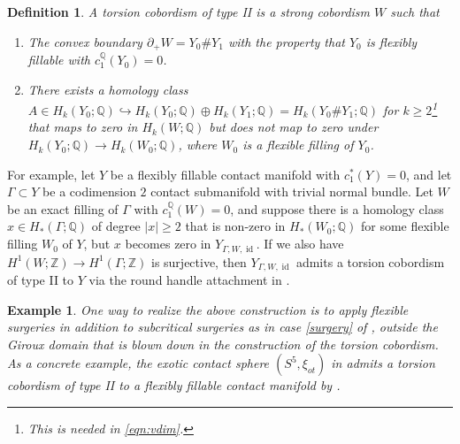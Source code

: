 \documentclass[11pt]{amsart}
\numberwithin{equation}{section}
\newtheorem{definition}[theorem]{\textbf{Definition}}
\newtheorem{example}[theorem]{\textbf{Example}}
\def\Z{{\mathbb Z}}
\def\Q{{\mathbb Q}}
\DeclareMathOperator{\Id}{id}
\begin{document}
\begin{definition}
        A torsion cobordism of type II is a strong cobordism $W$ such that
        \begin{enumerate}
            \item The convex boundary $\partial_+ W=Y_0\#Y_1$ with the property that $Y_0$ is flexibly fillable with $c_1^{\Q}(Y_0)=0$. 
            \item There exists a homology class $A\in H_k(Y_0;\Q)\hookrightarrow H_k(Y_0;\Q)\oplus H_k(Y_1;\Q)=H_k(Y_0\#Y_1;\Q)$ for $k\ge 2$\footnote{This is needed in \eqref{eqn:vdim}.} that maps to zero in $H_k(W;\Q)$ but does not map to zero under $H_k(Y_0;\Q)\to H_k(W_0;\Q)$, where $W_0$ is a flexible filling of $Y_0$.
        \end{enumerate}
\end{definition}
For example, let $Y$ be a flexibly fillable contact manifold with $c_1^*(Y)=0$, and let $\Gamma \subset Y$ be a codimension $2$ contact submanifold with trivial normal bundle. Let $W$ be an exact filling of $\Gamma$ with $c_1^{\Q}(W)=0$, and suppose there is a homology class $x\in H_*(\Gamma;\Q)$ of degree $|x|\ge 2$ that is non-zero in $H_*(W_0;\Q)$ for some flexible filling $W_0$ of $Y$, but $x$ becomes zero in $Y_{\Gamma,W,\Id}$. If we also have $H^1(W;\Z)\to H^1(\Gamma;\Z)$ is surjective, then $Y_{\Gamma,W,\Id}$ admits a torsion cobordism of type II to $Y$ via the round handle attachment in . 

\begin{example}\label{ex:exotic_5}
    One way to realize the above construction is to apply flexible surgeries in addition to subcritical surgeries as in case \eqref{surgery} of , outside the Giroux domain that is blown down in the construction of the torsion cobordism. As a concrete example, the exotic contact sphere $(S^5,\xi_{ot})$ in \cite{bowden2022tight} admits a torsion cobordism of type II to a flexibly fillable contact manifold by \cite[the proof of Theorem 5.1]{bowden2022tight}.
\end{example}
\end{document}
